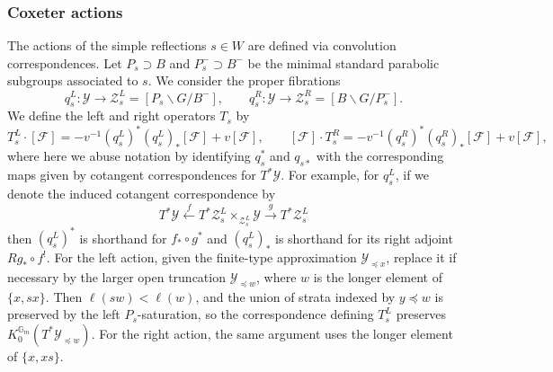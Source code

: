 \documentclass{amsart}
\newcommand{\mc}[1]{\mathcal{#1}}
\theoremstyle{definition}
\numberwithin{equation}{section}
\begin{document}
\subsubsection{Coxeter actions}\label{sec:coxeter-actions}
The actions of the simple reflections $s \in W$ are defined via convolution correspondences. Let $P_s \supset B$ and $P_s^- \supset B^-$ be the minimal standard parabolic subgroups associated to $s$. We consider the proper fibrations
\[
q_s^L: \mathcal{Y} \to \mathcal{Z}_s^L = [P_s \backslash G / B^-], \quad \quad q_s^R: \mathcal{Y} \to \mathcal{Z}_s^R = [B \backslash G / P_s^-].
\]
We define the left and right operators $T_s$ by
\[
T_s^L \cdot [\mathcal{F}] = -v^{-1}(q_s^L)^* (q_s^L)_* [\mathcal{F}] + v[\mathcal{F}], \quad \quad [\mathcal{F}] \cdot T_s^R = -v^{-1}(q_s^R)^* (q_s^R)_* [\mathcal{F}] + v[\mathcal{F}],
\]
where here we abuse notation by identifying $q_s^*$ and $q_{s*}$ with the corresponding maps given by cotangent correspondences for $T^*\mathcal{Y}$. For example, for $q_s^L$, if we denote the induced cotangent correspondence by
\[ T^*\mc{Y} \xleftarrow{f} T^*\mc{Z}_s^L \times_{\mc{Z}_s^L} \mc{Y} \xrightarrow{g} T^*\mc{Z}_s^L \]
then $(q_s^L)^*$ is shorthand for $f_*\circ g^*$ and $(q_s^L)_*$ is shorthand for its right adjoint $Rg_*\circ f^!$. For the left action, given the finite-type approximation $\mathcal{Y}_{\preceq x}$, replace it if necessary by the larger open truncation $\mathcal{Y}_{\preceq w}$, where $w$ is the longer element of $\{x,sx\}$. Then $\ell(sw)<\ell(w)$, and the union of strata indexed by $y\preceq w$ is preserved by the left $P_s$-saturation, so the correspondence defining $T_s^L$ preserves $K_0^{\mathbb{G}_m}(T^*\mathcal{Y}_{\preceq w})$. For the right action, the same argument uses the longer element of $\{x,xs\}$.
\end{document}
